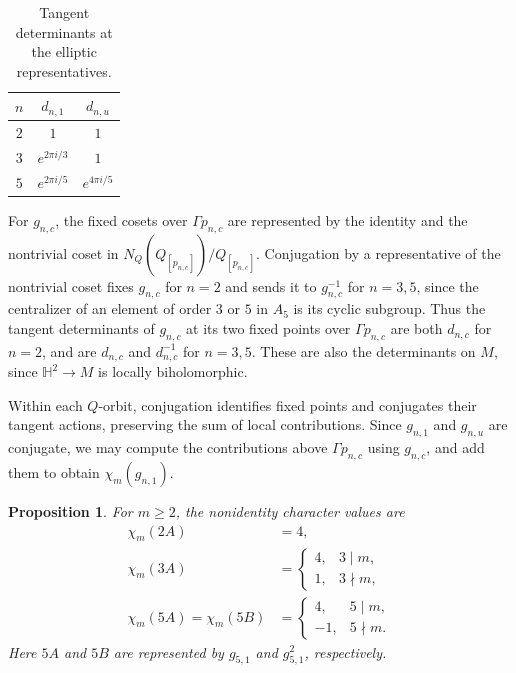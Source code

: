 \documentclass[11pt]{article}
\theoremstyle{definition}
\theoremstyle{plain}
\numberwithin{equation}{section}
\newtheorem{proposition}[theorem]{Proposition}
\newcommand{\HH}{\mathbb H}
\begin{document}
\begin{table}[htbp]
\centering
\begin{tabular}{c|cc}
$n$&$d_{n,1}$&$d_{n,u}$\\\hline
$2$&$1$&$1$\\
$3$&$e^{2\pi i/3}$&$1$\\
$5$&$e^{2\pi i/5}$&$e^{4\pi i/5}$
\end{tabular}
\caption{Tangent determinants at the elliptic representatives.}
\label{tab:a5-local}
\end{table}

For $g_{n,c}$, the fixed cosets over
$\Gamma p_{n,c}$ are represented by
the identity and the nontrivial coset in
$N_Q(Q_{[p_{n,c}]})/Q_{[p_{n,c}]}$.
Conjugation by a representative of the
nontrivial coset fixes $g_{n,c}$ for
$n=2$ and sends it to $g_{n,c}^{-1}$
for $n=3,5$, since the centralizer of
an element of order $3$ or $5$ in $A_5$
is its cyclic subgroup.
Thus the tangent determinants of
$g_{n,c}$ at its two fixed points over
$\Gamma p_{n,c}$ are both $d_{n,c}$
for $n=2$, and are $d_{n,c}$ and
$d_{n,c}^{-1}$ for $n=3,5$.
These are also the determinants on $M$,
since $\HH^2\to M$ is locally
biholomorphic.

Within each $Q$-orbit, conjugation
identifies fixed points and conjugates
their tangent actions, preserving the
sum of local contributions.
Since $g_{n,1}$ and $g_{n,u}$ are
conjugate, we may compute the contributions
above $\Gamma p_{n,c}$ using $g_{n,c}$,
and add them to obtain $\chi_m(g_{n,1})$.

\begin{proposition}\label{prop:a5-nonidentity}
For $m\geq2$, the nonidentity character
values are
\begin{equation}\label{eq:a5-nonidentity}
\begin{aligned}
\chi_m(2A)&=4,\\
\chi_m(3A)&=
\begin{cases}
4,&3\mid m,\\
1,&3\nmid m,
\end{cases}\\
\chi_m(5A)=\chi_m(5B)&=
\begin{cases}
4,&5\mid m,\\
-1,&5\nmid m.
\end{cases}
\end{aligned}
\end{equation}
Here $5A$ and $5B$ are represented
by $g_{5,1}$ and $g_{5,1}^2$,
respectively.
\end{proposition}
\end{document}
